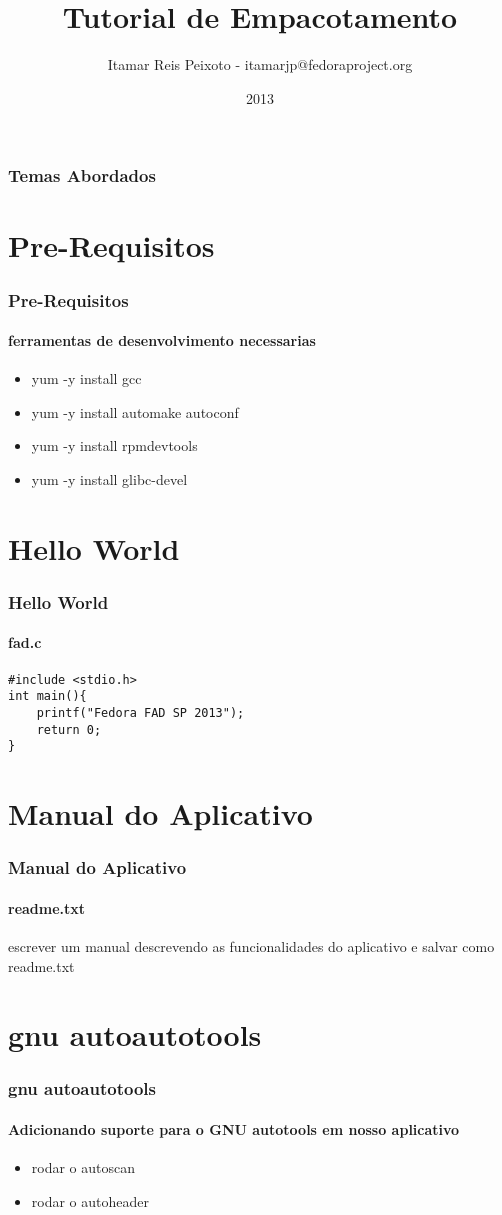\documentclass{beamer}
\title{Tutorial de Empacotamento}
\author{Itamar Reis Peixoto - itamarjp@fedoraproject.org}
\institute{Fedora Project}
\date{2013}
\begin{document}
\begin{frame}
\maketitle
\end{frame}

\begin{frame}
\frametitle{Temas Abordados}
\tableofcontents
\end{frame}



\section{Pre-Requisitos}
\begin{frame}
\frametitle{Pre-Requisitos}
\framesubtitle{ferramentas de desenvolvimento necessarias}
\begin{itemize}
\item yum -y install gcc
\item yum -y install automake autoconf
\item yum -y install rpmdevtools
\item yum -y install glibc-devel
\end{itemize}
\end{frame}






\section{Hello World}
\begin{frame}[fragile]
\frametitle{Hello World}
\framesubtitle{fad.c}
\begin{lstlisting}
#include <stdio.h>
int main(){
    printf("Fedora FAD SP 2013");
    return 0;
}
\end{lstlisting}
\end{frame}



\section{Manual do Aplicativo}
\begin{frame}
\frametitle{Manual do Aplicativo}
\framesubtitle{readme.txt}
escrever um manual descrevendo as funcionalidades do aplicativo e salvar como
readme.txt
\end{frame}


\section{gnu autoautotools}
\begin{frame}
\frametitle{gnu autoautotools}
\framesubtitle{Adicionando suporte para o GNU autotools em nosso aplicativo}

\begin{itemize}
\item rodar o autoscan
\item rodar o autoheader
\end{itemize}
\end{frame}
\end{document}
